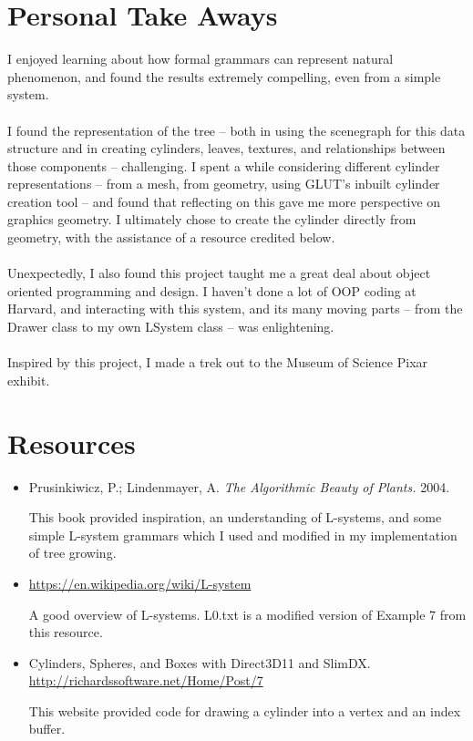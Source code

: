 \documentclass[11pt]{article} %
\begin{document}
\section{Personal Take Aways} 
I enjoyed learning about how formal grammars can represent natural phenomenon, and found the results extremely compelling, even from a simple system. 
\\ \\ 
\noindent I found the representation of the tree -- both in using the scenegraph for this data structure and in creating cylinders, leaves, textures, and relationships between those components -- challenging. I spent a while considering different cylinder representations -- from a mesh, from geometry, using GLUT's inbuilt cylinder creation tool -- and found that reflecting on this gave me more perspective on graphics geometry. I ultimately chose to create the cylinder directly from geometry, with the assistance of a resource credited below. 
\\ \\ 
\noindent Unexpectedly, I also found this project taught me a great deal about object oriented programming and design. I haven't done a lot of OOP coding at Harvard, and interacting with this system, and its many moving parts -- from the Drawer class to my own LSystem class -- was enlightening. 
\\ \\ 
\noindent Inspired by this project, I made a trek out to the Museum of Science Pixar exhibit. 

\section{Resources} 

\begin{itemize} 

\item Prusinkiwicz, P.; Lindenmayer, A. \emph{The Algorithmic Beauty of Plants.} 2004. 

This book provided inspiration, an understanding of L-systems, and some simple L-system grammars which I used and modified in my implementation of tree growing. 

\item \url{https://en.wikipedia.org/wiki/L-system} 

A good overview of L-systems. L0.txt is a modified version of Example 7 from this resource.

\item  Cylinders, Spheres, and Boxes with Direct3D11 and SlimDX. \url{http://richardssoftware.net/Home/Post/7} 

This website provided code for drawing a cylinder into a vertex and an index buffer. 
\end{itemize} 
\end{document}
